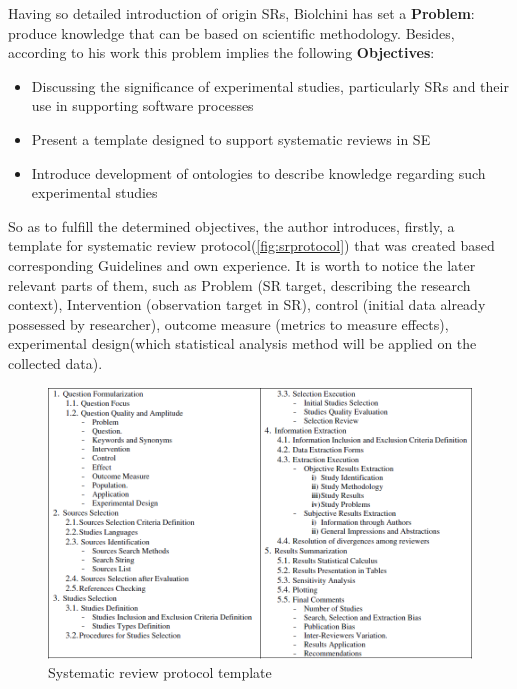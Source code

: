 	Having so detailed introduction of origin SRs, Biolchini has set a \textbf{Problem}: produce knowledge that can be based on scientific methodology. Besides, according to his work this problem implies the following \textbf{Objectives}:
		\begin{itemize}
			\item Discussing the significance of experimental studies, particularly SRs and their use in supporting software processes
			\item Present a template designed to support systematic reviews in SE
			\item Introduce development of ontologies to describe knowledge regarding such experimental studies
		\end{itemize}
	\label{sec:OntSRinSE:guidelines}    
	So as to fulfill the determined objectives, the author introduces, firstly, a template for systematic review protocol(\autoref{fig:srprotocol}) that was created based corresponding Guidelines\cite{Kit07} and own experience. It is worth to notice the later relevant parts of them, such as Problem (SR target, describing the research context), Intervention (observation target in SR), control (initial data already possessed by researcher), outcome measure (metrics to measure effects), experimental design(which statistical analysis method will be applied on the collected data).
	\begin{figure}
		\centering
		\includegraphics[width=15cm]{images/SRreviewprotocol.PNG}
		\caption{Systematic review protocol template\cite[p. 142]{Bio07}}
		\label{fig:srprotocol}
	\end{figure}
	 \newline
	
